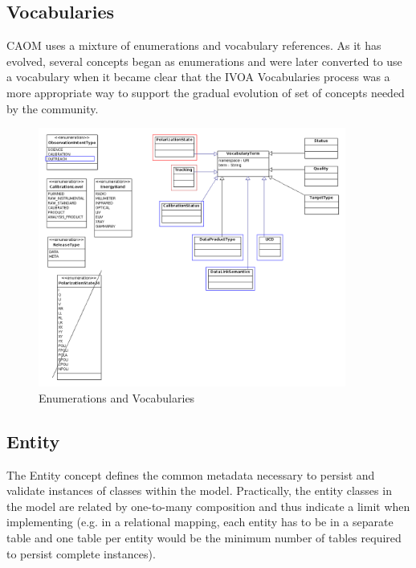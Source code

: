 \documentclass[11pt,a4paper]{ivoa}
\begin{document}
\subsection{Vocabularies}

CAOM uses a mixture of enumerations and vocabulary references. As it has evolved,
several concepts began as enumerations and were later converted to use a vocabulary
when it became clear that the IVOA Vocabularies process was a more appropriate way
to support the gradual evolution of set of concepts needed by the community.

\begin{figure}
\centering
\includegraphics[width=0.9\textwidth]{src/uml/CAOM3vocabularies.png}
\caption{Enumerations and Vocabularies}
\label{fig:vocab}
\end{figure}

\subsection{Entity}

The Entity concept defines the common metadata necessary to persist and validate 
instances of classes within the model. Practically, the entity classes in the 
model are related by one-to-many composition and thus indicate a limit when
implementing (e.g. in a relational mapping, each entity has to be in a separate
table and one table per entity would be the minimum number of tables required 
to persist complete instances).
\end{document}
